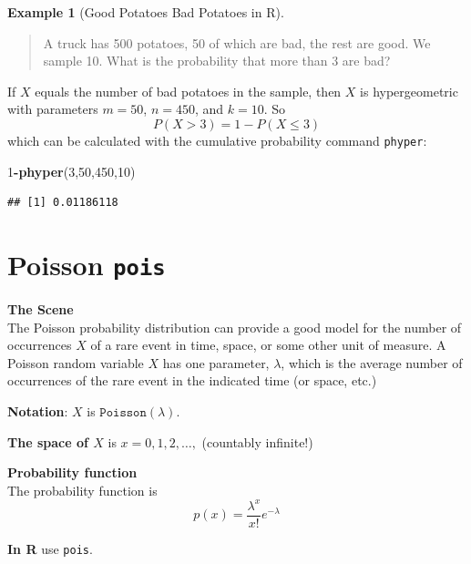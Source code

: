 \documentclass[
]{book}
\newenvironment{Shaded}{\begin{snugshade}}{\end{snugshade}}
\newcommand{\DecValTok}[1]{\textcolor[rgb]{0.00,0.00,0.81}{#1}}
\newcommand{\FunctionTok}[1]{\textcolor[rgb]{0.13,0.29,0.53}{\textbf{#1}}}
\newcommand{\NormalTok}[1]{#1}
\newcommand{\SpecialCharTok}[1]{\textcolor[rgb]{0.81,0.36,0.00}{\textbf{#1}}}
\theoremstyle{definition}
\theoremstyle{definition}
\newtheorem{example}{Example}[chapter]
\theoremstyle{definition}
\theoremstyle{definition}
\theoremstyle{remark}
\begin{document}
\begin{example}[Good Potatoes Bad Potatoes in R]
\protect\hypertarget{exm:potatoes-R}{}\label{exm:potatoes-R}\leavevmode

\begin{quote}
A truck has 500 potatoes, 50 of which are bad, the rest are good. We sample 10. What is the probability that more than 3 are bad?
\end{quote}

If \(X\) equals the number of bad potatoes in the sample, then \(X\) is hypergeometric with parameters \(m = 50\), \(n=450\), and \(k = 10\).
So \[P(X > 3) = 1 - P(X \leq 3)\]
which can be calculated with the cumulative probability command \texttt{phyper}:

\begin{Shaded}
\begin{Highlighting}[]
\DecValTok{1}\SpecialCharTok{{-}}\FunctionTok{phyper}\NormalTok{(}\DecValTok{3}\NormalTok{,}\DecValTok{50}\NormalTok{,}\DecValTok{450}\NormalTok{,}\DecValTok{10}\NormalTok{)}
\end{Highlighting}
\end{Shaded}

\begin{verbatim}
## [1] 0.01186118
\end{verbatim}

\end{example}

\section{\texorpdfstring{Poisson \texttt{pois}}{Poisson pois}}\label{poissonR}

\textbf{The Scene}\\
The Poisson probability distribution can provide a good model for the number of occurrences \(X\) of a rare event in time, space, or some other unit of measure. A Poisson random variable \(X\) has one parameter, \(\lambda\), which is the average number of occurrences of the rare event in the indicated time (or space, etc.)

\textbf{Notation}: \(X\) is \(\texttt{Poisson}(\lambda)\).

\textbf{The space of \(X\)} is \(x = 0,1,2,\ldots,\) (countably infinite!)

\textbf{Probability function}\\
The probability function is \[p(x)=\frac{\lambda^x}{x!}e^{-\lambda}\]

\textbf{In R} use \texttt{pois}.
\end{document}
